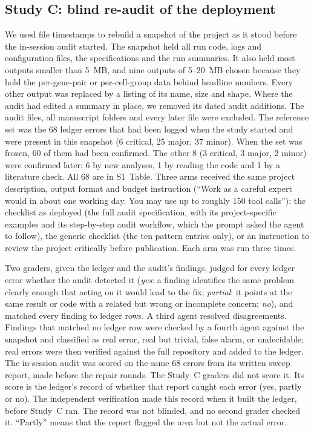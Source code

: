 \documentclass[10pt,letterpaper]{article}
\begin{document}
\subsection*{Study C: blind re-audit of the deployment}
We used file timestamps to rebuild a snapshot of the project as it stood
before the in-session audit started. The snapshot held all run code, logs
and configuration files, the specifications and the run summaries. It
also held most outputs smaller than 5~MB, and nine outputs of 5--20~MB
chosen because they hold the per-gene-pair or per-cell-group data behind
headline numbers. Every other output was replaced by a listing of its
name, size and shape. Where the audit had edited a summary in place, we
removed its dated audit additions. The audit files, all manuscript folders and
every later file were excluded. The reference set was the 68 ledger
errors that had been logged when the study started and were present in
this snapshot (6 critical, 25 major, 37 minor). When the set was frozen,
60 of them had been confirmed. The other 8 (3 critical, 3 major, 2 minor)
were confirmed later: 6 by new analyses, 1 by reading the code and 1 by
a literature check. All 68 are in S1~Table. Three arms received
the same project description, output format and budget instruction
(``Work as a careful expert would in about one working day. You may use
up to roughly 150 tool calls''): the checklist as deployed (the full
audit specification, with its project-specific examples and its step-by-step audit workflow, which
the prompt asked the agent to follow), the generic checklist (the ten
pattern entries only), or an instruction to review the project critically
before publication. Each arm was run three times.

Two graders, given the ledger and the audit's findings, judged for every
ledger error whether the audit detected it (\emph{yes}: a finding
identifies the same problem clearly enough that acting on it would lead
to the fix; \emph{partial}: it points at the same result or code with a
related but wrong or incomplete concern; \emph{no}), and matched every
finding to ledger rows. A third agent resolved disagreements. Findings
that matched no ledger row were checked by a fourth agent against the
snapshot and classified as real error, real but trivial, false alarm, or
undecidable; real errors were then verified against the full repository
and added to the ledger. The in-session audit was scored on the same 68
errors from its written sweep report, made before the repair rounds. The
Study~C graders did not score it. Its score is the ledger's record of
whether that report caught each error (yes, partly or no). The
independent verification made this record when it built the ledger,
before Study~C ran. The record was not blinded, and no second grader
checked it. ``Partly'' means that the report flagged
the area but not the actual error.
\end{document}
